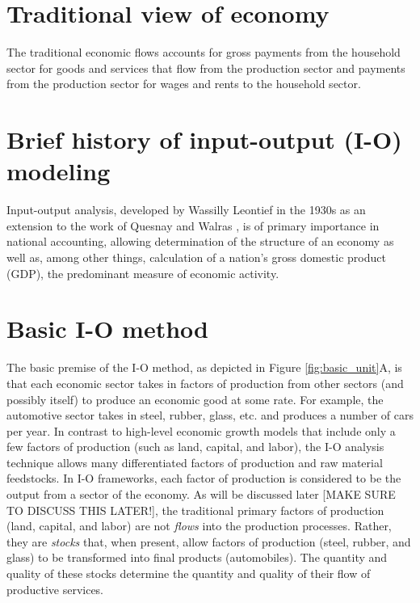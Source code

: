 \section{Traditional view of economy}

The traditional economic flows accounts for gross payments 
from the household sector for goods and services that flow 
from the production sector and payments 
from the production sector for wages and rents to the household sector.

\section{Brief history of input-output (I-O) modeling}

Input-output analysis, developed by Wassilly Leontief in the 1930s 
as an extension to the work of Quesnay and Walras \cite{Leontief1936}, 
is of primary importance in national accounting, 
allowing determination of the structure of an economy as well as, 
among other things, 
calculation of a nation's gross domestic product (GDP), 
the predominant measure of economic activity.

\section{Basic I-O method}

The basic premise of the I-O method, as depicted in Figure \ref{fig:basic_unit}A, is that each economic sector takes in factors of production from other sectors (and possibly itself) to produce an economic good at some rate. For example, the automotive sector takes in steel, rubber, glass, etc. and produces a number of cars per year. In contrast to high-level economic growth models that include only a few factors of production (such as land, capital, and labor), the I-O analysis technique allows many differentiated factors of production and raw material feedstocks. \cite{Costanza:1980ww} In I-O frameworks, each factor of production is considered to be the output from a sector of the economy. As will be discussed later [MAKE SURE TO DISCUSS THIS LATER!], the traditional primary factors of production (land, capital, and labor) are not \emph{flows} into the production processes. Rather, they are \emph{stocks} that, when present, allow factors of production (steel, rubber, and glass) to be transformed into final products (automobiles). The quantity and quality of these stocks determine the quantity and quality of their flow of productive services.


